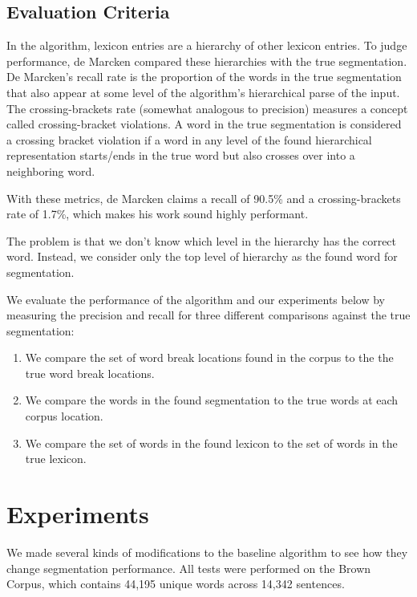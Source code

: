 \documentclass[11pt, oneside, fleqn]{article}
\begin{document}
  \subsection{Evaluation Criteria}

	In the algorithm, lexicon entries are a hierarchy of other lexicon entries. To judge performance, de Marcken compared these hierarchies with the true segmentation. De Marcken's recall rate is the proportion of the words in the true segmentation that also appear at some level of the algorithm's hierarchical parse of the input. The crossing-brackets rate (somewhat analogous to precision) measures a concept called crossing-bracket violations. A word in the true segmentation is considered a crossing bracket violation if a word in any level of the found hierarchical representation starts/ends in the true word but also crosses over into a neighboring word.
    
    With these metrics, de Marcken claims a recall of 90.5\% and a crossing-brackets rate of 1.7\%, which makes his work sound highly performant.

	The problem is that we don't know which level in the hierarchy has the correct word. Instead, we consider only the top level of hierarchy as the found word for segmentation.

	We evaluate the performance of the algorithm and our experiments below by measuring the precision and recall for three different comparisons against the true segmentation:
	
	\begin{enumerate}
		\item We compare the set of word break locations found in the corpus to the the true word break locations.
		\item We compare the words in the found segmentation to the true words at each corpus location.
		\item We compare the set of words in the found lexicon to the set of words in the true lexicon.
	\end{enumerate}

  \section*{Experiments}
  
  We made several kinds of modifications to the baseline algorithm to see how they change segmentation performance. All tests were performed on the Brown Corpus, which contains 44,195 unique words across 14,342 sentences.
\end{document}

